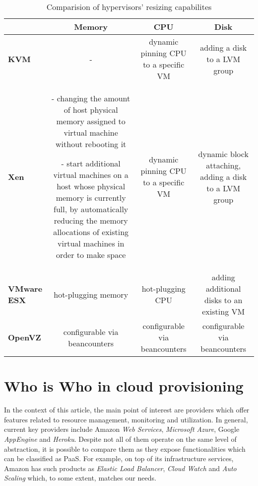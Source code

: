 \documentclass[twocolumn]{svjour3}          %
\begin{document}
\begin{table*}[ht]
  \renewcommand{\arraystretch}{2}
  \begin{tabular}{p{4cm} | *{3}{C}}
     & \textbf{Memory} & \textbf{CPU} & \textbf{Disk} \\ \hline

   \textbf{KVM} & 
   - &
   dynamic pinning CPU to a specific VM \footnotemark[1] &
   adding a disk to a LVM group 
   \\ \hline

   \textbf{Xen} &
  - changing the amount of host physical memory assigned to virtual machine without rebooting it

  - start additional virtual machines on a host whose physical memory is currently full, by automatically reducing the memory allocations of existing virtual machines in order to make space &
  dynamic pinning CPU to a specific VM \footnotemark[1] &
  dynamic block attaching, adding a disk to a LVM group
  \\ \hline

  \textbf{VMware ESX} &
hot-plugging memory \footnotemark[2] & 
hot-plugging CPU \footnotemark[2]  &
adding additional disks to an existing VM
\\ \hline

\textbf{OpenVZ} & configurable via beancounters & configurable via beancounters & configurable via beancounters\\ \hline



\end{tabular}

\caption{Comparision of hypervisors' resizing capabilites}
\label{tab:hypervisors-resizing}

\end{table*}


\section{Who is Who in cloud provisioning}
In the context of this article, the main point of interest are providers which offer features related to resource management, monitoring and utilization. In general, current key providers include Amazon \emph{Web Services}, \emph{Microsoft Azure}, Google \emph{AppEngine} and \emph{Heroku}. Despite not all of them operate on the same level of abstraction, it is possible to compare them as they expose functionalities which can be classified as PaaS. For example, on top of its infrastructure services, Amazon has such products as \emph{Elastic Load Balancer}, \emph{Cloud Watch} and \emph{Auto Scaling} which, to some extent, matches our needs.
\end{document}
